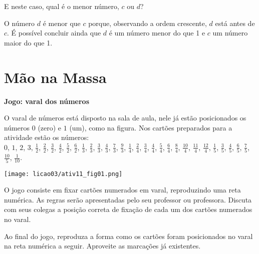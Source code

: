 E neste caso, qual é o menor número, $c$ ou $d$?

\begin{center}
\end{center}

O número $d$ é menor que $c$ porque, observando a ordem crescente, $d$ está antes de $c$. É possível concluir ainda que $d$ é um número menor do que 1 e $c$ um número maior do que 1. 

\clearpage
\section{Mão na Massa}

\begin{atividade}{}\label{chap3-ativ11}

{\bfseries Jogo: varal dos números}

O varal de números está disposto na sala de aula, nele já estão posicionados os números $0$ (zero) e $1$ (um), como na figura. Nos cartões preparados para a atividade estão os números: \\
$0$, $1$, $2$, $3$, $\frac{1}{2}$, $\frac{2}{2}$, $\frac{3}{2}$, $\frac{4}{2}$, $\frac{5}{2}$, $\frac{6}{2}$,
$\frac{1}{3}$, $\frac{2}{3}$, $\frac{3}{3}$, $\frac{4}{3}$, $\frac{7}{3}$, $\frac{9}{3}$,
$\frac{1}{4}$, $\frac{2}{4}$, $\frac{3}{4}$, $\frac{4}{4}$, $\frac{5}{4}$, $\frac{6}{4}$, $\frac{8}{4}$, $\frac{10}{4}$, $\frac{11}{4}$, $\frac{12}{4}$,
$\frac{1}{5}$, $\frac{3}{5}$, $\frac{4}{5}$, $\frac{6}{5}$, $\frac{7}{5}$, $\frac{10}{5}$,
$\frac{1}{10}$.

\begin{center}
\texttt{[image: licao03/ativ11\_fig01.png]}
\end{center}


O jogo consiste em fixar cartões numerados em varal, reproduzindo uma reta numérica. As regras serão apresentadas pelo seu professor ou professora. Discuta com seus colegas a posição correta de fixação de cada um dos cartões numerados no varal.

Ao final do jogo, reproduza a forma como os cartões foram posicionados no varal na reta numérica a seguir. Aproveite as marcações já existentes.

\begin{center}
\end{center}
\end{atividade}

